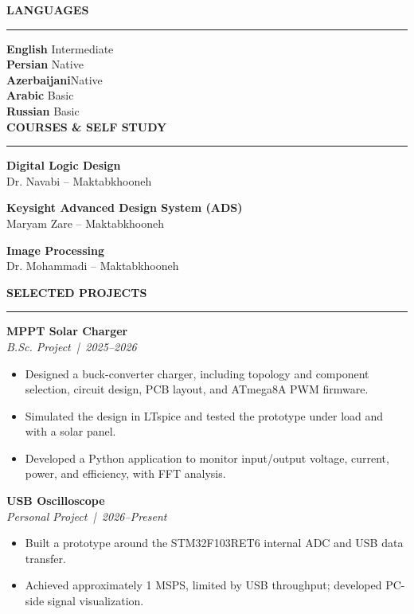 \documentclass[10pt,a4paper,ragged2e]{altacv}
\renewcommand{\cvsection}[2][]{%
  \bigskip
  \ifstrequal{#1}{}{}{\marginpar{\vspace*{\dimexpr1pt-\baselineskip}\raggedright}}%
  {\color{heading}\Large\bfseries\MakeUppercase{#2}}\\[-1ex]%
  {\color{heading}\rule{\linewidth}{2pt}\par}\medskip
}
\begin{document}
\cvsection{Languages}

\smallskip
\textbf{English} \hfill Intermediate\\
\textbf{Persian} \hfill Native\\
\textbf{Azerbaijani}\hfill Native\\
\textbf{Arabic} \hfill Basic\\
\textbf{Russian} \hfill Basic\\

\cvsection{Courses \& Self Study}

\smallskip
\textbf{Digital Logic Design}\\
{\footnotesize Dr. Navabi -- Maktabkhooneh}

\smallskip
\textbf{Keysight Advanced Design System (ADS)}\\
{\footnotesize Maryam Zare -- Maktabkhooneh}

\smallskip
\textbf{Image Processing}\\
{\footnotesize Dr. Mohammadi -- Maktabkhooneh}

\clearpage
{}

\cvsection{Selected Projects}

\textbf{MPPT Solar Charger}\\
\textit{B.Sc. Project \,|\, 2025--2026}
\begin{itemize}
  \item Designed a buck-converter charger, including topology and component selection,
        circuit design, PCB layout, and ATmega8A PWM firmware.
  \item Simulated the design in LTspice and tested the prototype under load and with a
        solar panel.
  \item Developed a Python application to monitor input/output voltage, current, power,
        and efficiency, with FFT analysis.
\end{itemize}
\divider

\textbf{USB Oscilloscope}\\
\textit{Personal Project \,|\, 2026--Present}
\begin{itemize}
  \item Built a prototype around the STM32F103RET6 internal ADC and USB data transfer.
  \item Achieved approximately 1 MSPS, limited by USB throughput; developed PC-side
        signal visualization.
\end{itemize}
\divider
\end{document}
